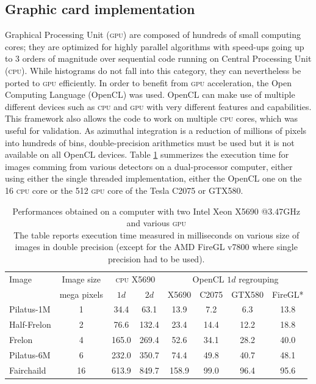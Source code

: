 \documentclass[a4paper]{jpconf}
\begin{document}
\subsection{Graphic card implementation}
Graphical Processing Unit (\textsc{gpu}) are composed of hundreds of
small computing cores; they are optimized for highly parallel algorithms
with speed-ups going up to 3 orders of magnitude over sequential code running
on Central Processing Unit (\textsc{cpu}).
While histograms do not fall into this category, they can  nevertheless be
ported to \textsc{gpu} efficiently. In order to benefit from \textsc{gpu} acceleration,
the Open Computing Language\cite{opencl} (OpenCL) was used. OpenCL can make use
of multiple different devices such as \textsc{cpu} and \textsc{gpu} with very 
different features and capabilities.
This framework also allows the code to work on multiple \textsc{cpu} cores, which was
useful for validation. As azimuthal integration is a reduction
of millions of pixels into hundreds of bins, double-precision arithmetics must
be used but it is not available on all OpenCL devices.
Table \ref{perfs} summerizes the execution time for images comming from various
detectors on a dual-processor computer, either using either the single threaded
implementation, either the OpenCL one on the 16 \textsc{cpu} core or the 512
\textsc{gpu} core of the Tesla C2075 or GTX580.

\begin{table}[h]
\begin{center}
\caption{\label{perfs}Performances obtained on a computer with two Intel
Xeon X5690 @3.47GHz and various \textsc{gpu}\\
 The table reports execution time measured in milliseconds on various size of
 images in double precision (except for the AMD FireGL v7800 where single
 precision had to be used).}

\begin{tabular}{|l|c||c|c||c|c|c|c|}
\hline
Image               & Image size 	& \multicolumn{2}{|c||}{\textsc{cpu} X5690}& \multicolumn{4}{|c|}{OpenCL $1d$ regrouping} \\
					& mega pixels	& $1d$	&	$2d$	&	X5690	&	C2075	&	GTX580	&	FireGL* \\
\hline
Pilatus-1M 			& 1  			& 34.4  &	63.1	&	13.9	&	7.2		&	6.3		&	13.8 \\
Half-Frelon 		& 2  			& 76.6  &   132.4   &	23.4	&	14.4	&	12.2	&	18.8 \\
Frelon 				& 4  			& 165.0	&	269.4   &	52.6	&	34.1	&	28.2	&	40.0 \\
Pilatus-6M 			& 6  			& 232.0	&	350.7	&	74.4	&	49.8	&	40.7	&	48.1 \\
Fairchaild 			& 16 			& 613.9	&	849.7   &	158.9	&	99.0	&	96.4	&	95.6 \\
\hline
\end{tabular}
\end{center}
\end{table}
\end{document}
